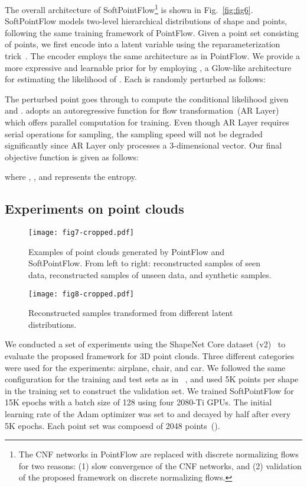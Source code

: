 \documentclass{article}
\begin{document}
The overall architecture of SoftPointFlow\footnote{The CNF networks in PointFlow are replaced with discrete normalizing flows for two reasons: (1) slow convergence of the CNF networks, and (2) validation of the proposed framework on discrete normalizing flows.} is shown in Fig.~\ref{fig:fig6}. SoftPointFlow models two-level hierarchical distributions of shape and points, following the same training framework of PointFlow. Given a point set  consisting of  points, we first encode  into a latent variable  using the reparameterization trick~\citep{kingma2013auto}. The encoder employs the same architecture as in PointFlow. We provide a more expressive and learnable prior for  by employing , a Glow-like architecture for estimating the likelihood of . Each  is randomly perturbed as follows:
 
 
 The perturbed point  goes through  to compute the conditional likelihood given  and .  adopts an autoregressive function for flow transformation~(AR Layer) which offers parallel computation for training. Even though AR Layer requires serial operations for sampling, the sampling speed will not be degraded significantly since AR Layer only processes a 3-dimensional vector. Our final objective function  is given as follows:
 
where , , and  represents the entropy. 

\subsection{Experiments on point clouds}
\begin{figure}[t]
	\centering
	\texttt{[image: fig7-cropped.pdf]}
    \caption{Examples of point clouds generated by PointFlow and SoftPointFlow. From left to right: reconstructed samples of seen data, reconstructed samples of unseen data, and synthetic samples.}
	\label{fig:fig7}
\end{figure}
\begin{figure}[t]
	\centering
	\texttt{[image: fig8-cropped.pdf]}
    \caption{Reconstructed samples transformed from different latent distributions.}
	\label{fig:fig8}
\end{figure}
We conducted a set of experiments using the ShapeNet Core dataset (v2)~\citep{chang2015shapenet} to evaluate the proposed framework for 3D point clouds. Three different categories were used for the experiments: airplane, chair, and car. We followed the same configuration for the  training and test sets as in ~\citet{yang2019pointflow}, and used 5K points per shape in the training set to construct the validation set. We trained SoftPointFlow for 15K epochs with a batch size of 128 using four 2080-Ti GPUs. The initial learning rate of the Adam optimizer was set to  and decayed by half after every 5K epochs. Each point set  was compoesd of 2048 points~().
\end{document}

